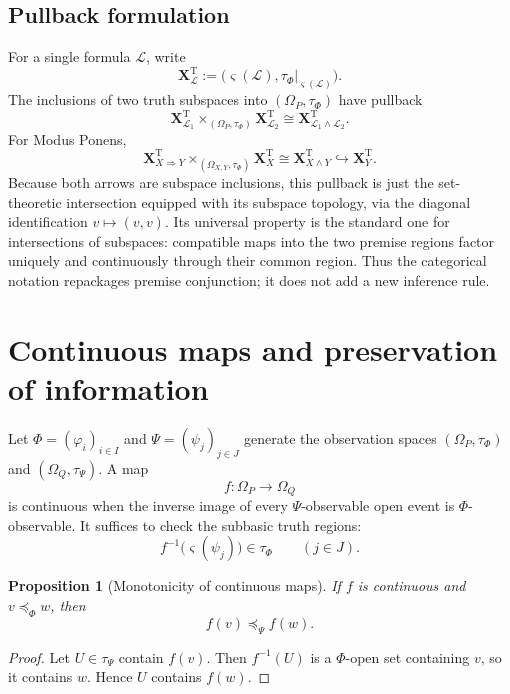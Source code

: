 \documentclass[11pt]{article}
\theoremstyle{definition}
\theoremstyle{plain}
\newtheorem{proposition}[definition]{Proposition}
\theoremstyle{remark}
\newcommand{\True}{\mathrm{T}}
\newcommand{\restr}{\mathord{|}}
\begin{document}
\subsection{Pullback formulation}

For a single formula $\mathcal L$, write
\[
 \mathbf X^\True_{\mathcal L}
 :=\bigl(\varsigma(\mathcal L),
          \tau_\Phi\restr_{\varsigma(\mathcal L)}\bigr).
\]
The inclusions of two truth subspaces into $(\Omega_P,\tau_\Phi)$ have pullback
\[
 \mathbf X^\True_{\mathcal L_1}
 \times_{(\Omega_P,\tau_\Phi)}
 \mathbf X^\True_{\mathcal L_2}
 \cong
 \mathbf X^\True_{\mathcal L_1\wedge\mathcal L_2}.
\]
For Modus Ponens,
\[
 \mathbf X^\True_{X\Rightarrow Y}
 \times_{(\Omega_{X,Y},\tau_\Phi)}
 \mathbf X^\True_X
 \cong
 \mathbf X^\True_{X\wedge Y}
 \hookrightarrow
 \mathbf X^\True_Y.
\]
Because both arrows are subspace inclusions, this pullback is just the
set-theoretic intersection equipped with its subspace topology, via the
diagonal identification $v\mapsto(v,v)$.  Its universal property is the
standard one for intersections of subspaces: compatible maps into the two
premise regions factor uniquely and continuously through their common region.
Thus the categorical notation repackages premise conjunction; it does not add a
new inference rule.

\section{Continuous maps and preservation of information}

Let $\Phi=(\varphi_i)_{i\in I}$ and $\Psi=(\psi_j)_{j\in J}$ generate the
observation spaces $(\Omega_P,\tau_\Phi)$ and $(\Omega_Q,\tau_\Psi)$.  A map
\[
 f:\Omega_P\longrightarrow\Omega_Q
\]
is continuous when the inverse image of every $\Psi$-observable open event is
$\Phi$-observable.  It suffices to check the subbasic truth regions:
\[
 f^{-1}\bigl(\varsigma(\psi_j)\bigr)\in\tau_\Phi
 \qquad(j\in J).
\]

\begin{proposition}[Monotonicity of continuous maps]
If $f$ is continuous and $v\preceq_\Phi w$, then
\[
 f(v)\preceq_\Psi f(w).
\]
\end{proposition}

\begin{proof}
Let $U\in\tau_\Psi$ contain $f(v)$.  Then $f^{-1}(U)$ is a $\Phi$-open set
containing $v$, so it contains $w$.  Hence $U$ contains $f(w)$.
\end{proof}
\end{document}
